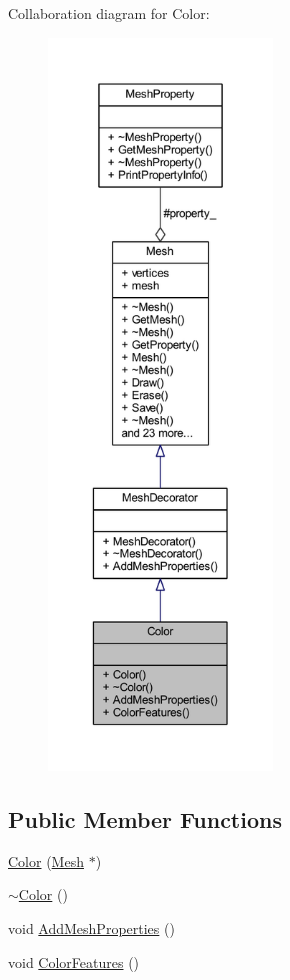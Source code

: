 Collaboration diagram for Color\+:\nopagebreak
\begin{figure}[H]
\begin{center}
\leavevmode
\includegraphics[height=550pt]{class_color__coll__graph}
\end{center}
\end{figure}
\subsection*{Public Member Functions}
\begin{DoxyCompactItemize}
\item 
\mbox{\hyperlink{class_color_a03838d592fc4c05285792631fc2b8e24}{Color}} (\mbox{\hyperlink{class_mesh}{Mesh}} $\ast$)
\item 
\mbox{\hyperlink{class_color_a3cfce6c6821d3bf489e26074c55378c0}{$\sim$\+Color}} ()
\item 
void \mbox{\hyperlink{class_color_abd3f6be3b5babb28bf1a13c89219bd4b}{Add\+Mesh\+Properties}} ()
\item 
void \mbox{\hyperlink{class_color_aa5aac2f7ae26dbb9fe44a5ad691ee842}{Color\+Features}} ()
\end{DoxyCompactItemize}
